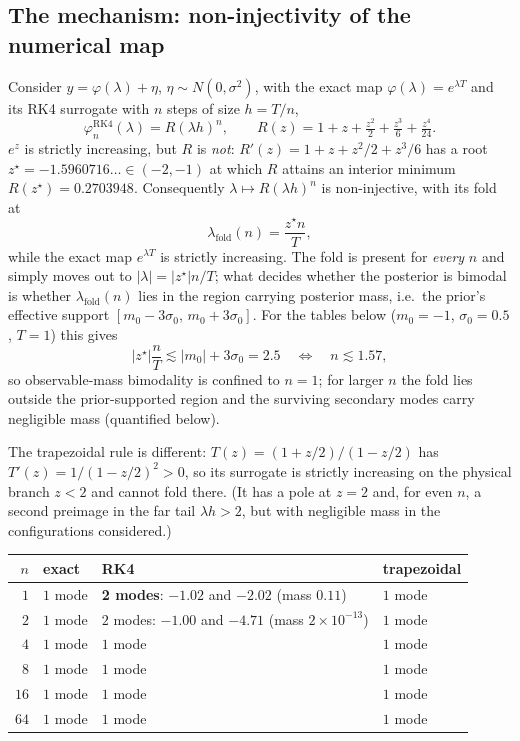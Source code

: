 \documentclass[11pt]{article}
\theoremstyle{definition}
\theoremstyle{remark}
\begin{document}
\subsection{The mechanism: non-injectivity of the numerical map}\label{sec:rk4}
Consider $y=\varphi(\lambda)+\eta$, $\eta\sim N(0,\sigma^2)$, with the exact map
$\varphi(\lambda)=e^{\lambda T}$ and its RK4 surrogate with $n$ steps of size $h=T/n$,
\[
  \varphi^{\mathrm{RK4}}_n(\lambda)=R(\lambda h)^{n},\qquad
  R(z)=1+z+\tfrac{z^2}{2}+\tfrac{z^3}{6}+\tfrac{z^4}{24}.
\]
$e^{z}$ is strictly increasing, but $R$ is \emph{not}: $R'(z)=1+z+z^2/2+z^3/6$ has a root
$z^\star=-1.5960716\ldots\in(-2,-1)$ at which $R$ attains an interior minimum $R(z^\star)=0.2703948$.
Consequently $\lambda\mapsto R(\lambda h)^n$ is non-injective, with its fold at
\begin{equation}\label{eq:nstar}
  \lambda_{\mathrm{fold}}(n)=\frac{z^\star n}{T},
\end{equation}
while the exact map $e^{\lambda T}$ is strictly increasing. The fold is present for \emph{every} $n$
and simply moves out to $|\lambda|=|z^\star|n/T$; what decides whether the posterior is bimodal is
whether $\lambda_{\mathrm{fold}}(n)$ lies in the region carrying posterior mass, i.e.\ the prior's
effective support $[m_0-3\sigma_0,\,m_0+3\sigma_0]$. For the tables below ($m_0=-1$, $\sigma_0=0.5$,
$T=1$) this gives
\[
  |z^\star|\frac{n}{T}\lesssim |m_0|+3\sigma_0=2.5
  \quad\Longleftrightarrow\quad n\lesssim1.57,
\]
so observable-mass bimodality is confined to $n=1$; for larger $n$ the fold lies outside the
prior-supported region and the surviving secondary modes carry negligible mass (quantified below).

The trapezoidal rule is different: $T(z)=(1+z/2)/(1-z/2)$ has $T'(z)=1/(1-z/2)^2>0$, so its
surrogate is strictly increasing on the physical branch $z<2$ and cannot fold there. (It has a pole
at $z=2$ and, for even $n$, a second preimage in the far tail $\lambda h>2$, but with negligible
mass in the configurations considered.)

\begin{center}
\begin{tabular}{rlll}
\toprule
$n$ & exact & RK4 & trapezoidal \\
\midrule
$1$  & $1$ mode & \textbf{2 modes}: $-1.02$ and $-2.02$ (mass $0.11$) & $1$ mode \\
$2$  & $1$ mode & $2$ modes: $-1.00$ and $-4.71$ (mass $2\times10^{-13}$) & $1$ mode \\
$4$  & $1$ mode & $1$ mode & $1$ mode \\
$8$  & $1$ mode & $1$ mode & $1$ mode \\
$16$ & $1$ mode & $1$ mode & $1$ mode \\
$64$ & $1$ mode & $1$ mode & $1$ mode \\
\bottomrule
\end{tabular}
\end{center}
\end{document}
